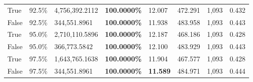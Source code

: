 \begin{table}[H]
\begin{tabular}{lllrllll}
\cline{1-8}
True & 92.5\% & 4,756,392.2112 & \bfseries \color{red} 100.0000\% & 12.007 & 472.291 & 1,093 & 0.432 \\
\cline{1-8}
False & 92.5\% & 344,551.8961 & \bfseries \color{red} 100.0000\% & 11.938 & 483.958 & 1,093 & 0.443 \\
\cline{1-8}
True & 95.0\% & 2,710,110.5896 & \bfseries \color{red} 100.0000\% & 12.187 & 468.186 & 1,093 & 0.428 \\
\cline{1-8}
False & 95.0\% & 366,773.5842 & \bfseries \color{red} 100.0000\% & 12.100 & 483.929 & 1,093 & 0.443 \\
\cline{1-8}
True & 97.5\% & 1,643,765.1638 & \bfseries \color{red} 100.0000\% & 11.904 & 467.577 & 1,093 & 0.428 \\
\cline{1-8}
False & 97.5\% & 344,551.8961 & \bfseries \color{red} 100.0000\% & \bfseries \color{red} 11.589 & 484.971 & 1,093 & 0.444 \\
\cline{1-8}
\bottomrule
\end{tabular}
\end{table}
